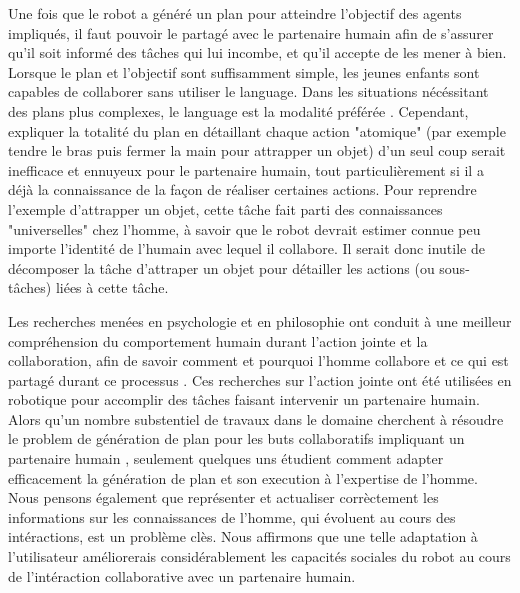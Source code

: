 \documentclass[a4paper,11pt,twoside]{StyleThese}
\begin{document}
Une fois que le robot a généré un plan pour atteindre l'objectif des agents impliqués, il faut pouvoir le partagé avec le partenaire humain afin de s'assurer qu'il soit informé des tâches qui lui incombe, et qu'il accepte de les mener à bien. Lorsque le plan et l'objectif sont suffisamment simple, les jeunes enfants sont capables de collaborer sans utiliser le language. Dans les situations nécéssitant des plans plus complexes, le language est la modalité préférée \cite{Warneken2006,Warneken2007}. Cependant, expliquer la totalité du plan en détaillant chaque action "atomique" (par exemple tendre le bras puis fermer la main pour attrapper un objet) d'un seul coup serait inefficace et ennuyeux pour le partenaire humain, tout particulièrement si il a déjà la connaissance de la façon de réaliser certaines actions. Pour reprendre l'exemple d'attrapper un objet, cette tâche fait parti des connaissances "universelles" chez l'homme, à savoir que le robot devrait estimer connue peu importe l'identité de l'humain avec lequel il collabore. Il serait donc inutile de décomposer la tâche d'attraper un objet pour détailler les actions (ou sous-tâches) liées à cette tâche. 

Les recherches menées en psychologie et en philosophie ont conduit à une meilleur compréhension du comportement humain durant l'action jointe et la collaboration, afin de savoir comment \cite{tomasello2005} et pourquoi \cite{tomasello2009} l'homme collabore et ce qui est partagé durant ce processus \cite{Butterfill2011}.
%
%
%
%
Ces recherches sur l'action jointe ont été utilisées en robotique pour accomplir des tâches faisant intervenir un partenaire humain. Alors qu'un nombre substentiel de travaux dans le domaine cherchent à résoudre le problem de génération de plan pour les buts collaboratifs impliquant un partenaire humain \cite{lallement14}, seulement quelques uns étudient comment adapter efficacement la génération de plan et son execution à l'expertise de l'homme. Nous pensons également que représenter et actualiser corrèctement les informations sur les connaissances de l'homme, qui évoluent au cours des intéractions, est un problème clès. Nous affirmons que une telle adaptation à l'utilisateur améliorerais considérablement les capacités sociales du robot au cours de l'intéraction collaborative avec un partenaire humain.
\end{document}
